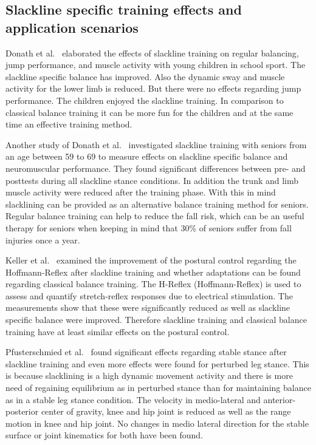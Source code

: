 \subsection{Slackline specific training effects and application scenarios}

Donath et al.~\cite{Donath2013-kk} elaborated the effects of slackline training on regular balancing, jump performance, and muscle activity with young children in school sport. The slackline specific balance has improved. Also the dynamic sway and muscle activity for the lower limb is reduced. But there were no effects regarding jump performance. The children enjoyed the slackline training. In comparison to classical balance training it can be more fun for the children and at the same time an effective training method.

Another study of Donath et al.~\cite{Donath2016-gm} investigated slackline training with seniors from an age between 59 to 69 to measure effects on slackline specific balance and neuromuscular performance. They found significant differences between pre- and posttests during all slackline stance conditions. In addition the trunk and limb muscle activity were reduced after the training phase. With this in mind slacklining can be provided as an alternative balance training method for seniors. Regular balance training can help to reduce the fall risk, which can be an useful therapy for seniors when keeping in mind that 30\% of seniors suffer from fall injuries once a year.

Keller et al.~\cite{Keller2012-xh} examined the improvement of the postural control regarding the Hoffmann-Reflex after slackline training and whether adaptations can be found regarding classical balance training. The H-Reflex (Hoffmann-Reflex) is used to assess and quantify stretch-reflex responses due to electrical stimulation. The measurements show that these were significantly reduced as well as slackline specific balance were improved. Therefore slackline training and classical balance training have at least similar effects on the postural control.

Pfusterschmied et al.~\cite{Pfusterschmied2013-yy} found significant effects regarding stable stance after slackline training and even more effects were found for perturbed leg stance. This is because slacklining is a high dynamic movement activity and there is more need of regaining equilibrium as in perturbed stance than for maintaining balance as in a stable leg stance condition. The velocity in medio-lateral and anterior-posterior center of gravity, knee and hip joint is reduced as well as the range motion in knee and hip joint. No changes in medio lateral direction for the stable surface or joint kinematics for both have been found.

